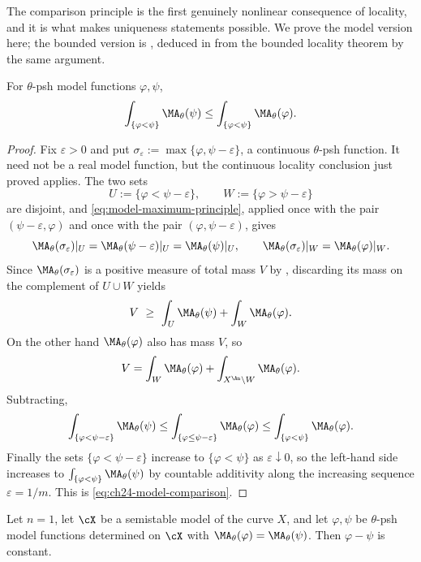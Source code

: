 The comparison principle is the first genuinely nonlinear consequence of
locality, and it is what makes uniqueness statements possible.  We prove the
model version here; the bounded version is
, deduced in
 from the bounded locality theorem by the same
argument.

\begin{proposition}
\label{prop:ch24-model-comparison}
For $\theta$-psh model functions $\varphi,\psi$,
\begin{equation}
\label{eq:ch24-model-comparison}
 \int_{\{\varphi<\psi\}}\MA_\theta(\psi)
 \leq
 \int_{\{\varphi<\psi\}}\MA_\theta(\varphi).
\end{equation}
\end{proposition}

\begin{proof}
Fix $\varepsilon>0$ and put $\sigma_\varepsilon
:=\max\{\varphi,\psi-\varepsilon\}$, a continuous $\theta$-psh
function.  It need not be a real model function, but the continuous
locality conclusion just proved applies.  The
two sets
\[
 U:=\{\varphi<\psi-\varepsilon\},
 \qquad
 W:=\{\varphi>\psi-\varepsilon\}
\]
are disjoint, and \eqref{eq:model-maximum-principle}, applied once with the
pair $(\psi-\varepsilon,\varphi)$ and once with the pair
$(\varphi,\psi-\varepsilon)$, gives
\[
 \MA_\theta(\sigma_\varepsilon)|_U=\MA_\theta(\psi-\varepsilon)|_U
 =\MA_\theta(\psi)|_U,
 \qquad
 \MA_\theta(\sigma_\varepsilon)|_W=\MA_\theta(\varphi)|_W .
\]
Since $\MA_\theta(\sigma_\varepsilon)$ is a positive measure of total mass
$V$ by , discarding its mass on the
complement of
$U\cup W$ yields
\[
 V\ \geq\ \int_U\MA_\theta(\psi)+\int_W\MA_\theta(\varphi).
\]
On the other hand $\MA_\theta(\varphi)$ also has mass $V$, so
\[
 V=\int_W\MA_\theta(\varphi)+\int_{X^{\An}\setminus W}\MA_\theta(\varphi).
\]
Subtracting,
\[
 \int_{\{\varphi<\psi-\varepsilon\}}\MA_\theta(\psi)
 \leq\int_{\{\varphi\leq\psi-\varepsilon\}}\MA_\theta(\varphi)
 \leq\int_{\{\varphi<\psi\}}\MA_\theta(\varphi).
\]
Finally the sets $\{\varphi<\psi-\varepsilon\}$ increase to
$\{\varphi<\psi\}$ as $\varepsilon\downarrow0$, so the left-hand side
increases to $\int_{\{\varphi<\psi\}}\MA_\theta(\psi)$ by countable
additivity along the increasing sequence $\varepsilon=1/m$.  This is
\eqref{eq:ch24-model-comparison}.
\end{proof}

\begin{corollary}
\label{cor:ch24-model-uniqueness-curve}
Let $n=1$, let $\cX$ be a semistable model of the curve $X$, and let
$\varphi,\psi$ be $\theta$-psh model functions determined on $\cX$
with $\MA_\theta(\varphi)=\MA_\theta(\psi)$.  Then $\varphi-\psi$ is
constant.
\end{corollary}

